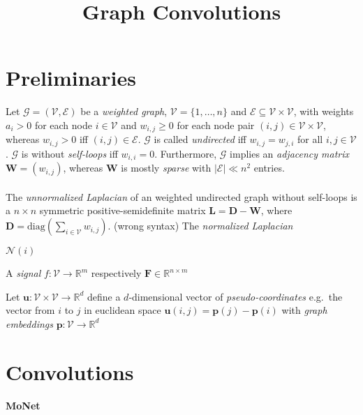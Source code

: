 \documentclass[pdftex,10pt,a4paper]{scrartcl}
\title{Graph Convolutions}
\date{\vspace{-5ex}}
\begin{document}
\maketitle

\section{Preliminaries}

Let $\mathcal{G} = (\mathcal{V}, \mathcal{E})$ be a \emph{weighted graph}, $\mathcal{V} = \{1, \ldots, n\}$ and $\mathcal{E} \subseteq \mathcal{V} \times \mathcal{V}$, with weights $a_i > 0$ for each node $i \in \mathcal{V}$ and $w_{i,j} \geq 0$ for each node pair $(i, j) \in \mathcal{V} \times \mathcal{V}$, whereas $w_{i,j} > 0$ iff $(i, j) \in \mathcal{E}$.
$\mathcal{G}$ is called \emph{undirected} iff $w_{i,j} = w_{j,i}$ for all $i,j \in \mathcal{V}$.
$\mathcal{G}$ is without \emph{self-loops} iff $w_{i,i} = 0$.
Furthermore, $\mathcal{G}$ implies an \emph{adjacency matrix} $\mathbf{W} = \left( w_{i,j} \right)$, whereas $\mathbf{W}$ is mostly \emph{sparse} with $|\mathcal{E}| \ll n^2$ entries.
\\\\
The \emph{unnormalized Laplacian} of an weighted undirected graph without self-loops is a $n \times n$ symmetric positive-semidefinite matrix $\mathbf{L} = \mathbf{D} - \mathbf{W}$, where $\mathbf{D} = \mathrm{diag}\left( \sum_{i \in \mathcal{V}} w_{i,j}\right)$. (wrong syntax)
The \emph{normalized Laplacian}

$\mathcal{N}(i)$

A \emph{signal} $f \colon \mathcal{V} \to \mathbb{R}^m$ respectively $\mathbf{F} \in \mathbb{R}^{n \times m}$

Let $\mathbf{u} \colon \mathcal{V} \times \mathcal{V} \to \mathbb{R}^d$ define a $d$-dimensional vector of \emph{pseudo-coordinates}
e.g.\ the vector from $i$ to $j$ in euclidean space $\mathbf{u}(i,j) = \mathbf{p}(j) - \mathbf{p}(i)$ with \emph{graph embeddings} $\mathbf{p} \colon \mathcal{V} \to \mathbb{R}^d$
\cite{Bronstein2017}

\section{Convolutions}

\paragraph{MoNet}
\end{document}

